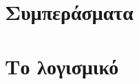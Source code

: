 \documentclass[11pt]{report}
\begin{document}
\chapter{Συμπεράσματα}




\appendix
\chapter{Το λογισμικό}

%
\end{document}
